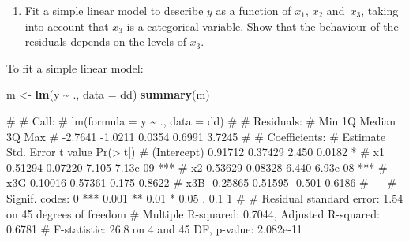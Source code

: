\documentclass[
  a4paper,
]{article}
\newenvironment{Shaded}{\begin{snugshade}}{\end{snugshade}}
\newcommand{\AttributeTok}[1]{\textcolor[rgb]{0.13,0.29,0.53}{#1}}
\newcommand{\FunctionTok}[1]{\textcolor[rgb]{0.13,0.29,0.53}{\textbf{#1}}}
\newcommand{\NormalTok}[1]{#1}
\newcommand{\OtherTok}[1]{\textcolor[rgb]{0.56,0.35,0.01}{#1}}
\newcommand{\SpecialCharTok}[1]{\textcolor[rgb]{0.81,0.36,0.00}{\textbf{#1}}}
\providecommand{\tightlist}{%
  \setlength{\itemsep}{0pt}\setlength{\parskip}{0pt}}
\theoremstyle{definition}
\theoremstyle{definition}
\theoremstyle{definition}
\theoremstyle{definition}
\theoremstyle{remark}
\begin{document}
\begin{enumerate}
\def\labelenumi{\alph{enumi}.}
\setcounter{enumi}{1}
\tightlist
\item
  Fit a simple linear model to describe \(y\) as a function of \(x_1\), \(x_2\)
  and~\(x_3\), taking into account that \(x_3\) is a categorical variable.
  Show that the behaviour of the residuals depends on the levels of \(x_3\).
\end{enumerate}

\begin{myanswers}
To fit a simple linear model:

\begin{Shaded}
\begin{Highlighting}[]
\NormalTok{m }\OtherTok{\textless{}{-}} \FunctionTok{lm}\NormalTok{(y }\SpecialCharTok{\textasciitilde{}}\NormalTok{ ., }\AttributeTok{data =}\NormalTok{ dd)}
\FunctionTok{summary}\NormalTok{(m)}
\end{Highlighting}
\end{Shaded}

\begin{Shaded}
\begin{Highlighting}[]
\NormalTok{\# }
\NormalTok{\# Call:}
\NormalTok{\# lm(formula = y \textasciitilde{} ., data = dd)}
\NormalTok{\# }
\NormalTok{\# Residuals:}
\NormalTok{\#     Min      1Q  Median      3Q     Max }
\NormalTok{\# {-}2.7641 {-}1.0211  0.0354  0.6991  3.7245 }
\NormalTok{\# }
\NormalTok{\# Coefficients:}
\NormalTok{\#             Estimate Std. Error t value Pr(\textgreater{}|t|)    }
\NormalTok{\# (Intercept)  0.91712    0.37429   2.450   0.0182 *  }
\NormalTok{\# x1           0.51294    0.07220   7.105 7.13e{-}09 ***}
\NormalTok{\# x2           0.53629    0.08328   6.440 6.93e{-}08 ***}
\NormalTok{\# x3G          0.10016    0.57361   0.175   0.8622    }
\NormalTok{\# x3B         {-}0.25865    0.51595  {-}0.501   0.6186    }
\NormalTok{\# {-}{-}{-}}
\NormalTok{\# Signif. codes:  0 \textquotesingle{}***\textquotesingle{} 0.001 \textquotesingle{}**\textquotesingle{} 0.01 \textquotesingle{}*\textquotesingle{} 0.05 \textquotesingle{}.\textquotesingle{} 0.1 \textquotesingle{} \textquotesingle{} 1}
\NormalTok{\# }
\NormalTok{\# Residual standard error: 1.54 on 45 degrees of freedom}
\NormalTok{\# Multiple R{-}squared:  0.7044,  Adjusted R{-}squared:  0.6781 }
\NormalTok{\# F{-}statistic:  26.8 on 4 and 45 DF,  p{-}value: 2.082e{-}11}
\end{Highlighting}
\end{Shaded}


\end{myanswers}
\end{document}
